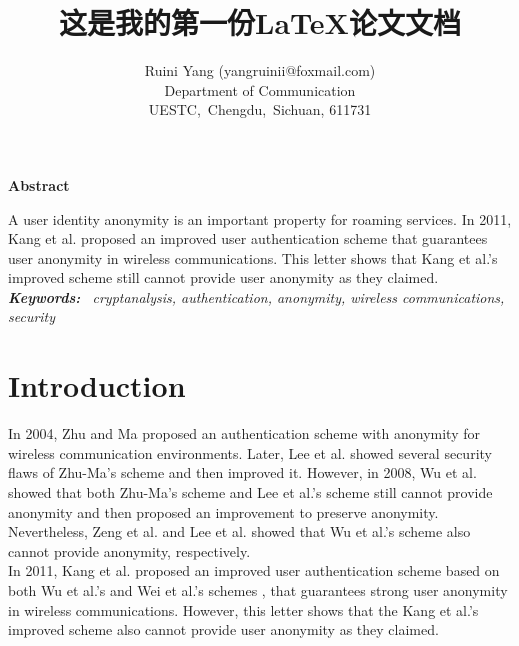 \documentclass{article}
\title{这是我的第一份\LaTeX{}论文文档}
\author{Ruini Yang (yangruinii@foxmail.com) \\Department of Communication \\
UESTC,\ Chengdu,\ Sichuan, 611731}
\begin{document}
    {
        \maketitle
        \begin{center}
        \textbf{Abstract} \\
        \end{center}
        \qquad A user identity anonymity is an important property for roaming services. In 2011, Kang et al. proposed an improved user authentication scheme that guarantees user anonymity in wireless communications. This letter shows that Kang et al.'s improved scheme still cannot provide user anonymity as they claimed.\\
        \indent \emph{\textbf{Keywords:} \ cryptanalysis, authentication, anonymity, wireless communications, security} \\
\section{Introduction}
\noindent In 2004, Zhu and Ma \cite{Li10} proposed an authentication scheme with anonymity for wireless 
communication environments. Later, Lee et al. \cite{Zhang10} showed several security flaws of Zhu-Ma’s scheme and then 
improved it. However, in 2008, Wu et al. \cite{Lohr10} showed that both Zhu-Ma’s scheme and Lee et al.’s scheme still 
cannot provide anonymity and then proposed an improvement to preserve anonymity. Nevertheless, Zeng et al. 
\cite{WangWRL10} and Lee et al. \cite{Barsoum11} showed that Wu et al.’s scheme also cannot provide anonymity, respectively.\\ \indent In 2011, Kang et al. \cite{ZYan122} proposed an improved user authentication scheme based on both Wu et al.’s and 
Wei et al.’s schemes \cite{Lohr10}, \cite{Ateniese11} that guarantees strong user anonymity in wireless communications. However, this 
letter shows that the Kang et al.’s improved scheme also cannot provide user anonymity as they claimed.
    }
\end{document}
